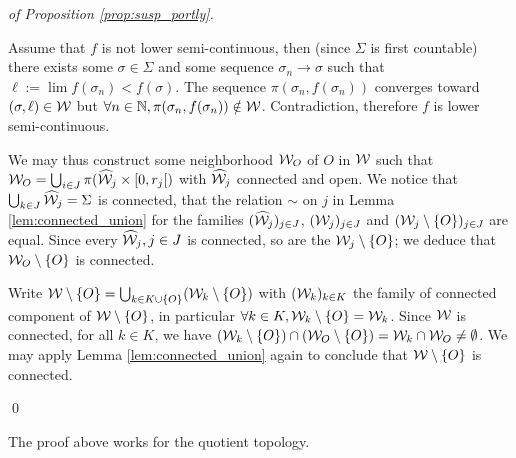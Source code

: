 \begin{proof}[of Proposition \ref{prop:susp_portly}]
\begin{itemize}
 Assume that $f$ is not lower semi-continuous, then (since $\Sigma$ is first countable) there exists some $\sigma\in \Sigma$ and some sequence  $\sigma_n\rightarrow  \sigma$ such that $\ell:=\lim f(\sigma_n)<f(\sigma)$. The sequence $\pi(\sigma_n,f(\sigma_n))$ converges toward $(\sigma,\ell) \in \mathcal W$ but $\forall n\in \mathbb{N}, \pi(\sigma_n,f(\sigma_n)) \notin \mathcal W$. Contradiction, therefore $f$ is lower semi-continuous.

 We may thus construct some neighborhood $\mathcal W_O$ of $O$ in $\mathcal W$ such that $\mathcal W_O = \bigcup_{i\in J} \pi(\widehat {\mathcal W}_j \times [0,r_j[)$ with $\widehat {\mathcal W}_j$ connected and open. We notice that $\bigcup_{k\in J} \widehat {\mathcal W}_j = \Sigma$ is connected, that the relation $\sim$ on $j$ in Lemma \ref{lem:connected_union} 
 for the families $(\widehat {\mathcal W}_j)_{j\in J}$, $(\mathcal W_j)_{j\in J}$ and $(\mathcal W_j\setminus \{O\})_{j\in J}$ are equal. Since every $\widehat {\mathcal W}_j, j\in J$ is connected, so are the $\mathcal W_j\setminus \{O\}$;    we deduce that $\mathcal W_O\setminus \{O\}$ is connected.  
 
 Write $\mathcal W\setminus \{O\} = \bigcup_{k\in K\cup \{O\}} (\mathcal W_k\setminus \{O\})$ 
 with $(\mathcal W_k)_{k\in K}$ the family of connected component of $\mathcal W\setminus \{O\}$, in particular $\forall k\in K, \mathcal W_k\setminus \{O\}=\mathcal W_k$. Since $\mathcal W$ is connected, for all $k\in K$, we have $(\mathcal W_k\setminus \{O\}) \cap (\mathcal W_O \setminus \{O\})=\mathcal W_k\cap \mathcal W_O \neq \emptyset$. We may apply Lemma \ref{lem:connected_union} again to conclude that $\mathcal W\setminus \{O\}$ is connected.
 
 \end{itemize}
\qed\end{proof}
\begin{rem} The proof above works for the quotient topology.
 
\end{rem}

 



 

